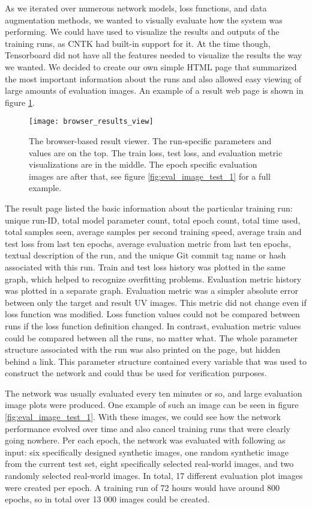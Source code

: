 As we iterated over numerous network models, loss functions, and data augmentation methods, we wanted to visually evaluate how the system was performing. We could have used \textcite{tensorboard} to visualize the results and outputs of the training runs, as \ac{CNTK} had built-in support for it. At the time though, Tensorboard did not have all the features needed to visualize the results the way we wanted. We decided to create our own simple \ac{HTML} page that summarized the most important information about the runs and also allowed easy viewing of large amounts of evaluation images. An example of a result web page is shown in figure \ref{fig:browser_results_view_1}.

\begin{figure}
    \centering
    \texttt{[image: browser\_results\_view]}
    \caption[Browser-based results viewer]{The browser-based result viewer. The run-specific parameters and values are on the top. The train loss, test loss, and evaluation metric visualizations are in the middle. The epoch specific evaluation images are after that, see figure \ref{fig:eval_image_test_1} for a full example.}
    \label{fig:browser_results_view_1}
\end{figure}

The result page listed the basic information about the particular training run: unique run-ID, total model parameter count, total epoch count, total time used, total samples seen, average samples per second training speed, average train and test loss from last ten epochs, average evaluation metric from last ten epochs, textual description of the run, and the unique Git commit tag name or hash associated with this run. Train and test loss history was plotted in the same graph, which helped to recognize overfitting problems. Evaluation metric history was plotted in a separate graph. Evaluation metric was a simpler absolute error between only the target and result UV images. This metric did not change even if loss function was modified. Loss function values could not be compared between runs if the loss function definition changed. In contrast, evaluation metric values could be compared between all the runs, no matter what. The whole parameter structure associated with the run was also printed on the page, but hidden behind a link. This parameter structure contained every variable that was used to construct the network and could thus be used for verification purposes.

The network was usually evaluated every ten minutes or so, and large evaluation image plots were produced. One example of such an image can be seen in figure \ref{fig:eval_image_test_1}. With these images, we could see how the network performance evolved over time and also cancel training runs that were clearly going nowhere. Per each epoch, the network was evaluated with following as input: six specifically designed synthetic images, one random synthetic image from the current test set, eight specifically selected real-world images, and two randomly selected real-world images. In total, 17 different evaluation plot images were created per epoch. A training run of 72 hours would have around 800 epochs, so in total over 13 000 images could be created.


